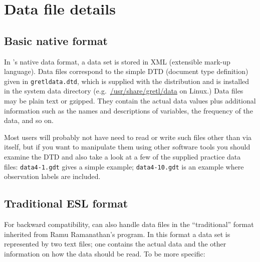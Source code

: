 \chapter{Data file details}
\label{app-datafile}

\section{Basic native format}
\label{native}

In 's native data format, a data set is stored in XML
(extensible mark-up language). Data files correspond to the simple DTD
(document type definition) given in \verb+gretldata.dtd+, which is
supplied with the  distribution and is installed in the
system data directory (e.g.\ \url{/usr/share/gretl/data} on Linux.)
Data files may be plain text or gzipped.  They contain the actual data
values plus additional information such as the names and descriptions
of variables, the frequency of the data, and so on.

Most users will probably not have need to read or write such files
other than via  itself, but if you want to manipulate them
using other software tools you should examine the DTD and also take a
look at a few of the supplied practice data files: \verb+data4-1.gdt+
gives a simple example; \verb+data4-10.gdt+ is an example where
observation labels are included.

\section{Traditional ESL format}
\label{traddata}

For backward compatibility,  can also handle data files in
the ``traditional'' format inherited from Ramu Ramanathan's 
program.  In this format a data set is represented by two text files;
one contains the actual data and the other information on how the data
should be read.  To be more specific:

